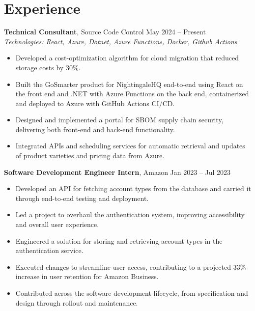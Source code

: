 \documentclass[11pt,a4paper]{article}
\begin{document}
\section{Experience}
\textbf{Technical Consultant}, Source Code Control \hfill May 2024 -- Present
\\ \textit{Technologies: React, Azure, Dotnet, Azure Functions, Docker, Github Actions}
\begin{itemize}
  \item Developed a cost-optimization algorithm for cloud migration that reduced storage costs by 30\%.
  \item Built the GoSmarter product for NightingaleHQ end-to-end using React on the front end and .NET with Azure Functions on the back end, containerized and deployed to Azure with GitHub Actions CI/CD.
  \item Designed and implemented a portal for SBOM supply chain security, delivering both front-end and back-end functionality.
  \item Integrated APIs and scheduling services for automatic retrieval and updates of product varieties and pricing data from Azure.
\end{itemize}
\vspace{2pt}
\textbf{Software Development Engineer Intern}, Amazon \hfill Jan 2023 -- Jul 2023
\begin{itemize}
  \item Developed an API for fetching account types from the database and carried it through end-to-end testing and deployment.
  \item Led a project to overhaul the authentication system, improving accessibility and overall user experience.
  \item Engineered a solution for storing and retrieving account types in the authentication service.
  \item Executed changes to streamline user access, contributing to a projected 33\% increase in user retention for Amazon Business.
  \item Contributed across the software development lifecycle, from specification and design through rollout and maintenance.
\end{itemize}
\vspace{2pt}
\end{document}
